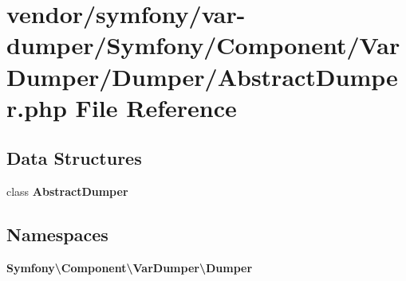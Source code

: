 \section{vendor/symfony/var-\/dumper/\+Symfony/\+Component/\+Var\+Dumper/\+Dumper/\+Abstract\+Dumper.php File Reference}
\label{_abstract_dumper_8php}
\subsection*{Data Structures}
\begin{DoxyCompactItemize}
\item 
class {\bf Abstract\+Dumper}
\end{DoxyCompactItemize}
\subsection*{Namespaces}
\begin{DoxyCompactItemize}
\item 
 {\bf Symfony\textbackslash{}\+Component\textbackslash{}\+Var\+Dumper\textbackslash{}\+Dumper}
\end{DoxyCompactItemize}
